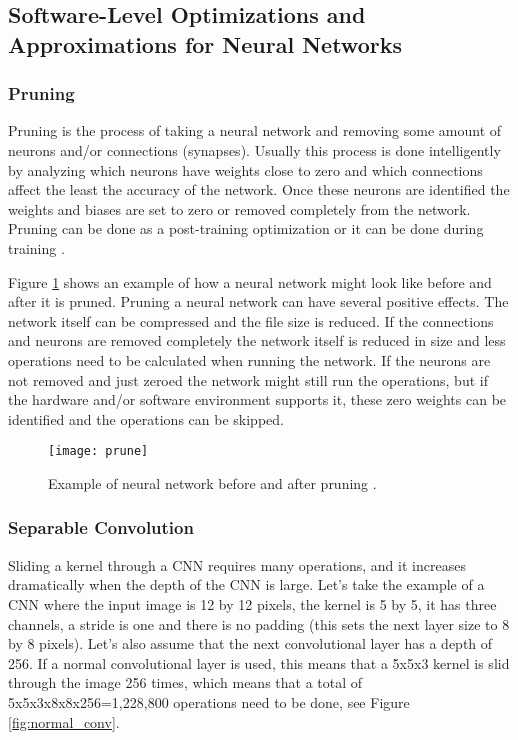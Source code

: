 \subsection{Software-Level Optimizations and Approximations for Neural Networks}

\subsubsection{Pruning}

Pruning is the process of taking a neural network and removing some amount of neurons and/or connections (synapses). Usually this process is done intelligently by analyzing which neurons have weights close to zero and which connections affect the least the accuracy of the network. Once these neurons are identified the weights and biases are set to zero or removed completely from the network. Pruning can be done as a post-training optimization or it can be done during training \cite{prune1}.

Figure \ref{fig:prune} shows an example of how a neural network might look like before and after it is pruned. Pruning a neural network can have several positive effects. The network itself can be compressed and the file size is reduced. If the connections and neurons are removed completely the network itself is reduced in size and less operations need to be calculated when running the network. If the neurons are not removed and just zeroed the network might still run the operations, but if the hardware and/or software environment supports it, these zero weights can be identified and the operations can be skipped.

\begin{figure}[thbp]
	\centering
	\texttt{[image: prune]}
	\caption{Example of neural network before and after pruning \cite{Han2015}.}
	\label{fig:prune}
\end{figure}

\subsubsection{Separable Convolution}

Sliding a kernel through a CNN requires many operations, and it increases dramatically when the depth of the CNN is large. Let's take the example of a CNN where the input image is 12 by 12 pixels, the kernel is 5 by 5, it has three channels, a stride is one and there is no padding (this sets the next layer size to 8 by 8 pixels). Let's also assume that the next convolutional layer has a depth of 256. If a normal convolutional layer is used, this means that a 5x5x3 kernel is slid through the image 256 times, which means that a total of 5x5x3x8x8x256=1,228,800 operations need to be done, see Figure \ref{fig:normal_conv}.

